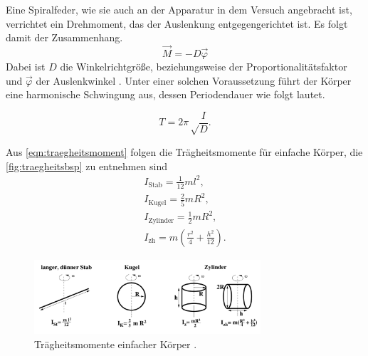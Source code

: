 \noindent
Eine Spiralfeder, wie sie auch an der Apparatur in dem Versuch angebracht ist, verrichtet ein Drehmoment, das der Auslenkung entgegengerichtet ist.
Es folgt damit der Zusammenhang.
\begin{equation}
    \label{eqn:winkelrichtgr}
    \vec M = -D \vec\varphi    
\end{equation} 
Dabei ist $D$ die Winkelrichtgröße, beziehungsweise der Proportionalitätsfaktor
und $\vec\varphi$ der Auslenkwinkel \cite{gerthsen}.
Unter einer solchen Voraussetzung führt der Körper eine harmonische Schwingung aus, dessen Periodendauer wie folgt lautet.

\begin{equation}
    \label{eqn:periode}
    T=2\pi\sqrt\frac{I}{D}.
\end{equation}

Aus \autoref{eqn:traegheitsmoment} folgen die Trägheitsmomente für  einfache Körper, die \autoref{fig:traegheitsbsp} zu entnehmen sind
\begin{align}
    I_{\text{Stab}} = \frac{1}{12} ml^2, \label{eqn:Istab} \\
    I_{\text{Kugel}} = \frac{2}{5} mR^2, \label{eqn:IKugel} \\
    I_{\text{Zylinder}} = \frac{1}{2} mR^2, \label{eqn:Izylinder} \\
    I_{\text{zh}} = m (\frac{r^2}{4} +\frac{h^2}{12}). \label{eqn:Izh}
\end{align}

\begin{figure}[H]
    \centering
    \includegraphics[width=0.75\textwidth]{Bilder/traegheitsbeispiele.png}
    \caption{Trägheitsmomente einfacher Körper \cite{Anleitung}.}
    \label{fig:traegheitsbsp}
  \end{figure}